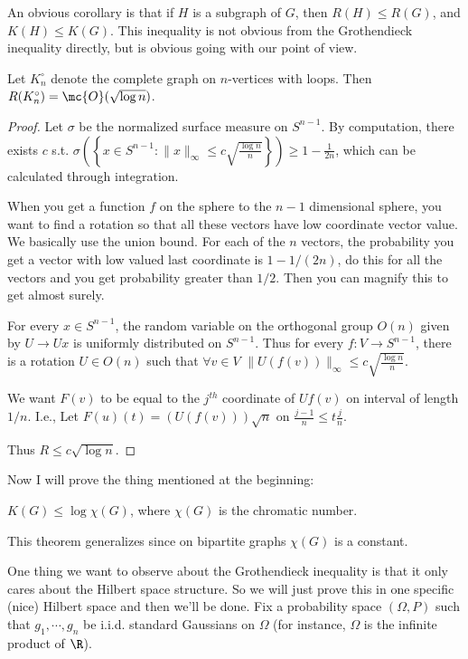 An obvious corollary is that if $H$ is a subgraph of $G$, then $R(H) \leq R(G)$, and $K(H) \leq K(G)$. This inequality is not obvious from the Grothendieck inequality directly, but is obvious going with our point of view. 

\begin{lem} Let $K_n^{\circ}$ denote the complete graph on $n$-vertices with loops. Then 
$R(K_n^{\circ}) = \mc{O}(\sqrt{\log n})$. 
\end{lem}
\begin{proof}
Let $\sigma$ be the normalized surface measure on $S^{n - 1}$. By computation, there exists $c$ s.t. $\sigma\left(\left\{ x \in S^{n - 1}: \|x\|_{\infty} \leq c\sqrt{\frac{\log n}{n}}\right\}\right) \geq 1 - \frac{1}{2n}$, which can be calculated through integration. 

When you get a function $f$ on the sphere to the $n - 1$ dimensional sphere, you want to find a rotation so that all these vectors have low coordinate vector value. We basically use the union bound. For each of the $n$ vectors, the probability you get a vector with low valued last coordinate is $1 - 1/(2n)$, do this for all the vectors and you get probability greater than $1/2$. Then you can magnify this to get almost surely.

For every $x \in S^{n - 1}$, the random variable on the orthogonal group $O(n)$ given by $U\to Ux$ is uniformly distributed on $S^{n - 1}$.  Thus for every $f: V \to S^{n - 1}$, there is a rotation $U \in O(n)$ such that $\forall v \in V$ $\|U(f(v))\|_{\infty} \leq c\sqrt{\frac{\log n}{n}}$. 

We want $F(v)$ to be equal to the $j^{th}$ coordinate of $Uf(v)$ on interval of length $1/n$. I.e., 
Let $F(u)(t) = (U(f(v))) \sqrt{n}$ on $\frac{j - 1}{n} \leq t \frac{j}{n}$. 

Thus $R \leq c \sqrt{\log n}$. 
\end{proof}

Now I will prove the thing mentioned at the beginning: 
\begin{thm} $K(G) \leq \log \chi(G)$, where $\chi(G)$ is the chromatic number. 
\end{thm}

This theorem generalizes since on bipartite graphs $\chi(G)$ is a constant. 

One thing we want to observe about the Grothendieck inequality is that it only cares about the Hilbert space structure. So we will just prove this in one specific (nice) Hilbert space and then we'll be done. Fix a probability space $(\Omega, P)$ such that $g_1, \cdots, g_n$ be i.i.d. standard Gaussians on $\Omega$ (for instance, $\Omega$ is the infinite product of $\R$). 

